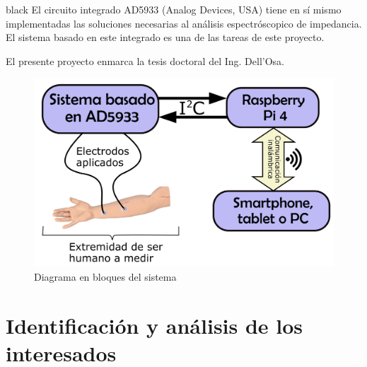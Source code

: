 \documentclass[11pt]{charter}
\begin{document}
\begin{consigna}{black}
El circuito integrado AD5933 (Analog Devices, USA) tiene en sí mismo implementadas las soluciones necesarias al análisis espectróscopico de impedancia. El sistema basado en este integrado es una de las tareas de este proyecto.

El presente proyecto enmarca la tesis doctoral del Ing. Dell’Osa.

\vspace{25px}

\begin{figure}[H]
\centering 
\includegraphics[width=.7\textwidth]{./Figuras/Diagr_principal.png}
\caption{Diagrama en bloques del sistema}
\label{fig:diagBloques}
\end{figure}

\vspace{25px}
\end{consigna}

\pagebreak

\section{Identificación y análisis de los interesados}
\label{sec:interesados}
\end{document}
